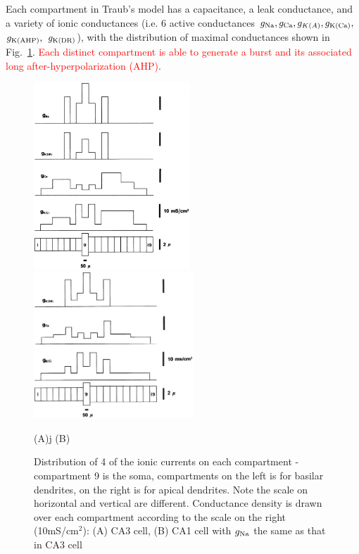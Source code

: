 Each compartment in Traub's model has a capacitance, a leak conductance, and a
variety of ionic conductances (i.e. 6 active conductances $g_{\ce{Na}},
g_{\ce{Ca}}, g_{K(A)}, g_{\ce{K(Ca)}},$ $ g_{\ce{K(AHP)}},$ $g_{\ce{K(DR)}}$),
with the distribution of maximal conductances shown in
Fig.~\ref{fig:traub_ion_distribution}.
\textcolor{red}{Each distinct compartment is able to generate a burst and its
associated long after-hyperpolarization (AHP)}.

\begin{figure}[hbt]
  \centerline{\includegraphics[height=7cm,
    angle=0]{./images/traub_ion_distribution.eps}\includegraphics[height=5.5cm,
    angle=0]{./images/traub_ion_distribution_CA1.eps}}
\centerline{(A)j \;\;\;\;\;\;\;\;\;(B)}
  \caption{Distribution of 4 of the ionic currents on each compartment
    - compartment 9 is the soma, compartments on the left is for
    basilar dendrites, on the right is for apical dendrites. Note the
    scale on horizontal and vertical are different. Conductance
    density is drawn over each compartment according to the scale on
    the right (10mS/cm$^2$): (A) CA3 cell, (B) CA1 cell with
    $g_{\ce{Na}}$ the same as that in CA3 cell}
\label{fig:traub_ion_distribution}
\end{figure}



